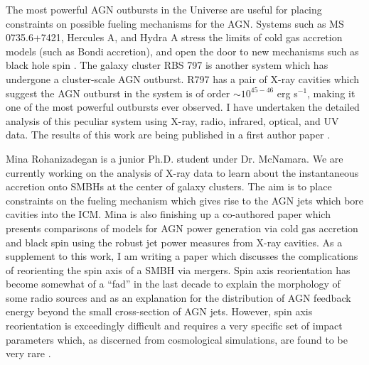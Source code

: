 \documentclass[letterpaper,12pt]{article}
\begin{document}
The most powerful AGN outbursts in the Universe are useful for placing
constraints on possible fueling mechanisms for the AGN. Systems such
as MS 0735.6+7421, Hercules A, and Hydra A stress the limits of cold
gas accretion models (such as Bondi accretion), and open the door to
new mechanisms such as black hole spin \cite{bhspin}. The galaxy
cluster RBS 797 is another system which has undergone a cluster-scale
AGN outburst. R797 has a pair of X-ray cavities which suggest the AGN
outburst in the system is of order $\sim 10^{45-46}$ erg s$^{-1}$,
making it one of the most powerful outbursts ever observed. I have
undertaken the detailed analysis of this peculiar system using X-ray,
radio, infrared, optical, and UV data. The results of this work are
being published in a first author paper \cite{r797}.

\cite{steepspec}

Mina Rohanizadegan is a junior Ph.D. student under Dr. McNamara. We
are currently working on the analysis of X-ray data to learn about the
instantaneous accretion onto SMBHs at the center of galaxy
clusters. The aim is to place constraints on the fueling mechanism
which gives rise to the AGN jets which bore cavities into the
ICM. Mina is also finishing up a co-authored paper which presents
comparisons of models for AGN power generation via cold gas accretion
and black spin using the robust jet power measures from X-ray
cavities. As a supplement to this work, I am writing a paper which
discusses the complications of reorienting the spin axis of a SMBH via
mergers. Spin axis reorientation has become somewhat of a ``fad'' in
the last decade to explain the morphology of some radio sources and as
an explanation for the distribution of AGN feedback energy beyond the
small cross-section of AGN jets. However, spin axis reorientation is
exceedingly difficult and requires a very specific set of impact
parameters which, as discerned from cosmological simulations, are
found to be very rare \cite{spinaxis}.


\end{document}
